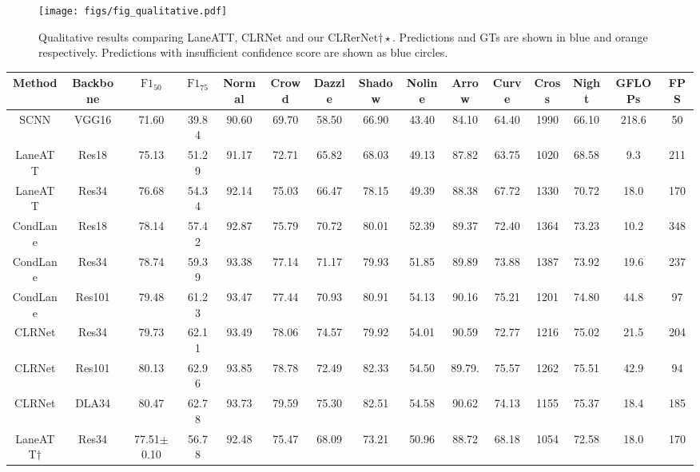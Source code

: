 \documentclass[10pt,twocolumn,letterpaper]{article}
\begin{document}
\begin{figure}[t]
\begin{center}
   \texttt{[image: figs/fig\_qualitative.pdf]}
  \end{center}
\caption{Qualitative results comparing LaneATT, CLRNet and our CLRerNet$\dagger\star$. Predictions and GTs are shown in blue and orange respectively. Predictions with insufficient confidence score are shown as blue circles.}
\label{fig:qualitative}
\end{figure}
\begin{table*}
\begin{adjustbox}{width=\textwidth} 
\begin{tabular}{ccccccccccccccc}
\hline
Method & Backbone & $\text{F1}_{50}$ &  $\text{F1}_{75}$  & Normal & Crowd & Dazzle & Shadow & Noline & Arrow& Curve  & Cross & Night & GFLOPs & FPS \\
\hline
SCNN & VGG16 & 71.60 & 39.84 & 90.60 & 69.70 & 58.50 & 66.90 & 43.40 & 84.10 & 64.40 & 1990 & 66.10 & 218.6 & 50 \\
LaneATT & Res18 & 75.13 & 51.29 & 91.17 & 72.71 & 65.82 & 68.03 & 49.13 & 87.82 & 63.75 & 1020 &  68.58 & 9.3 & 211 \\
LaneATT & Res34 & 76.68 & 54.34 &  92.14 & 75.03 & 66.47 & 78.15 & 49.39 & 88.38 & 67.72 & 1330 & 70.72 & 18.0 & 170 \\
CondLane\cite{Liu_2021_ICCV} & Res18 & 78.14 & 57.42 & 92.87 & 75.79 & 70.72 & 80.01 & 52.39 & 89.37 & 72.40 & 1364 & 73.23 & 10.2& 348\\
CondLane\cite{Liu_2021_ICCV}  & Res34 & 78.74 & 59.39 & 93.38 & 77.14 &  71.17 & 79.93 & 51.85 & 89.89 & 73.88 & 1387 & 73.92 & 19.6 & 237\\
CondLane\cite{Liu_2021_ICCV}  & Res101 & 79.48 & 61.23 & 93.47 & 77.44  & 70.93 & 80.91 & 54.13 & 90.16 & 75.21 & 1201& 74.80 & 44.8 & 97\\
CLRNet\cite{Zheng_2022_CVPR} & Res34 & 79.73 & 62.11 & 93.49 & 78.06 & 74.57 & 79.92 & 54.01 & 90.59 & 72.77 & 1216  & 75.02 & 21.5 &  204 \\
CLRNet\cite{Zheng_2022_CVPR} & Res101 & 80.13 & 62.96 & 93.85 & 78.78 & 72.49 & 82.33 & 54.50  & 89.79.& 75.57 & 1262 & 75.51 & 42.9 & 94 \\
CLRNet\cite{Zheng_2022_CVPR} & DLA34 &  80.47 & 62.78 & 93.73 & 79.59 & 75.30 & 82.51 & 54.58 & 90.62 & 74.13 & 1155 & 75.37 &  18.4 &  185 \\
\hline
\hline
LaneATT$\dagger$ & Res34 & 77.51\footnotesize{$\pm$0.10} &56.78 & 92.48 & 75.47 & 68.09 & 73.21 & 50.96 & 88.72 & 68.18 & 1054 & 72.58 & 18.0 & 170 \\

\end{tabular}
\end{adjustbox}
\end{table*}
\end{document}
